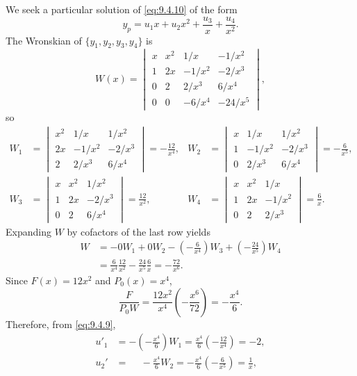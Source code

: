 \begin{solution}
We seek a particular solution of \eqref{eq:9.4.10} of the form
\[
y_p=u_1x+u_2x^2+\frac{u_3}{x}+\frac{u_4}{x^2}.
\]
The Wronskian of  $\{y_1,y_2,y_3,y_4\}$ is
\[
W(x)=\begin{vmatrix}
x&x^2&1/x&-1/x^2 \\
1&2x&-1/x^2&-2/x^3 \\
0&2&2/x^3&6/x^4\\
0&0&-6/x^4&-24/x^5
\end{vmatrix},
\]
so
\begin{align*}
W_1
&=\begin{vmatrix}
x^2&1/x&1/x^2\\[5pt]2x&-1/x^2&-2/x^3\\2&2/x^3&6/x^4
\end{vmatrix}=-\frac{12}{x^4},&%
W_2
&=\begin{vmatrix}
x&1/x&1/x^2\\1&-1/x^2&-2/x^3\\0&2/x^3&6/x^4
\end{vmatrix}=-\frac{6}{x^5},\\
W_3
&=\begin{vmatrix}
x&x^2&1/x^2\\1&2x&-2/x^3\\0&2&6/x^4
\end{vmatrix}=\frac{12}{x^2},  &%
W_4
&=\begin{vmatrix}
x&x^2&1/x\\1&2x&-1/x^2\\0&2&2/x^3
\end{vmatrix}=\frac{6}{x}.
\end{align*}
Expanding $W$ by cofactors of the last row yields
\begin{align*}
W
&=-0W_1+0 W_2-\left(-\frac{6}{x^4}\right)W_3+\left(-\frac{24}{x^5}\right)W_4\\
&=\frac{6}{x^4}\frac{12}{x^2}-\frac{24}{x^5}\frac{6}{x}=-\frac{72}{x^6}.
\end{align*}
 Since $F(x)=12x^2$ and $P_0(x)=x^4$,
\[
\frac{F}{P_0W}=\frac{12x^2}{x^4}\left(-\frac{x^6}{72}\right)=-\frac{x^4}{6}.
\]
Therefore, from \eqref{eq:9.4.9},
\begin{align*}
u'_1
&=-\left(-\frac{x^4}{6}\right)W_1=\frac{x^4}{6}\left(-\frac{12}{x^4}\right)=-2,\\
u_2'
&=\phantom{-}-\frac{x^4}{6}W_2=-\frac{x^4}{6}\left(-\frac{6}{x^5}\right)
=\frac{1}{x},\\

\end{align*}
\end{solution}
